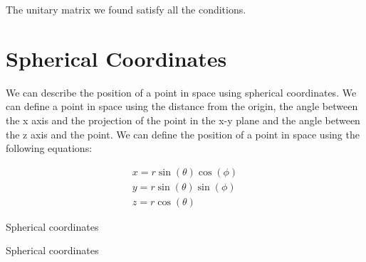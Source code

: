 The unitary matrix we found satisfy all the conditions.

\section{Spherical Coordinates}

We can describe the position of a point in space using spherical coordinates. We can define a point in space using the distance from the origin, the angle between the x axis and the projection of the point in the x-y plane and the angle between the z axis and the point. We can define the position of a point in space using the following equations:

\begin{equation}
  \begin{array}{c}
    x = r\sin(\theta)\cos(\phi)\\
    y = r\sin(\theta)\sin(\phi)\\
    z = r\cos(\theta)
  \end{array}
\end{equation}

\begin{marginfigure}[-4cm]
  \caption{Spherical coordinates}
\end{marginfigure}

\begin{marginfigure}[1cm]
  \caption{Spherical coordinates}
\end{marginfigure}



